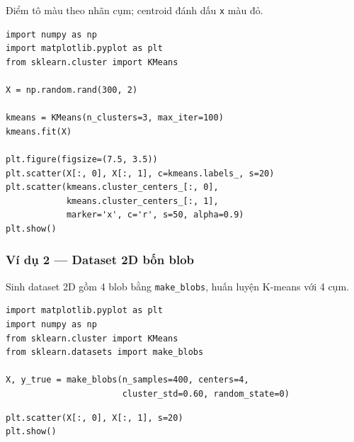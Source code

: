 \begin{ynghia}[title={Kết quả phân cụm}]
Điểm tô màu theo nhãn cụm; centroid đánh dấu \texttt{x} màu đỏ.

\end{ynghia}

\begin{vidu}[title={Code đầy đủ (ví dụ 1)}]
\begin{lstlisting}
import numpy as np
import matplotlib.pyplot as plt
from sklearn.cluster import KMeans

X = np.random.rand(300, 2)

kmeans = KMeans(n_clusters=3, max_iter=100)
kmeans.fit(X)

plt.figure(figsize=(7.5, 3.5))
plt.scatter(X[:, 0], X[:, 1], c=kmeans.labels_, s=20)
plt.scatter(kmeans.cluster_centers_[:, 0],
            kmeans.cluster_centers_[:, 1],
            marker='x', c='r', s=50, alpha=0.9)
plt.show()
\end{lstlisting}
\end{vidu}

\subsubsection{Ví dụ 2 --- Dataset 2D bốn blob}

\begin{dongco}[title={Bối cảnh}]
Sinh dataset 2D gồm 4 blob bằng \texttt{make\_blobs}, huấn luyện K-means với 4 cụm.
\end{dongco}

\begin{vidu}[title={Import và sinh blob}]
\begin{lstlisting}
import matplotlib.pyplot as plt
import numpy as np
from sklearn.cluster import KMeans
from sklearn.datasets import make_blobs

X, y_true = make_blobs(n_samples=400, centers=4,
                       cluster_std=0.60, random_state=0)
\end{lstlisting}
\end{vidu}

\begin{vidu}[title={Vẽ dữ liệu gốc}]
\begin{lstlisting}
plt.scatter(X[:, 0], X[:, 1], s=20)
plt.show()
\end{lstlisting}
\end{vidu}

\begin{ynghia}[title={Trực quan 2D blob}]
\end{ynghia}

